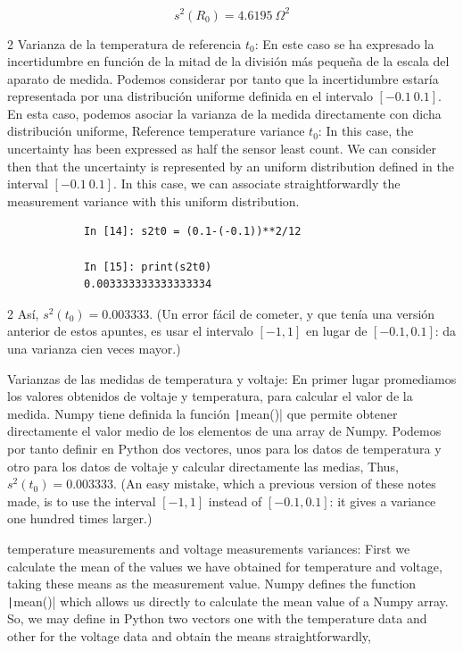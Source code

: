 \begin{equation*}
s^2(R_0)= 4.6195\ \Omega^2
\end{equation*}
\begin{paracol}{2}
\textbullet Varianza de la temperatura de referencia $t_0$: En este caso se ha expresado la incertidumbre en función de la mitad de la división más pequeña de la escala del aparato de medida. Podemos considerar por tanto que la incertidumbre estaría representada por una distribución uniforme definida en el intervalo $[-0.1\ 0.1]$. En esta caso, podemos asociar la varianza de la medida directamente con dicha distribución uniforme,
\switchcolumn
\textbullet Reference temperature variance $t_0$: In this case, the uncertainty has been expressed as half the sensor least count. We can consider then that the uncertainty is represented by an uniform distribution defined in the interval $[-0.1\ 0.1]$. In this case, we can associate straightforwardly the measurement variance with this uniform distribution.  
\end{paracol}

\begin{center}
	\begin{minipage}{\textwidth}
		\begin{verbatim}
			In [14]: s2t0 = (0.1-(-0.1))**2/12

			In [15]: print(s2t0)
			0.003333333333333334		
		\end{verbatim}
	\end{minipage}
\end{center}

\begin{paracol}{2}
Así, $s^2(t_0)=0.003333$. (Un error fácil de cometer, y que tenía una versión anterior de estos apuntes, es usar el intervalo $[-1,1]$ en lugar de $[-0.1,0.1]$: da una varianza cien veces mayor.)

\textbullet Varianzas de las medidas de temperatura y voltaje:
En primer lugar promediamos los valores  obtenidos de voltaje y temperatura, para calcular el valor de la medida. Numpy tiene definida la función \texttt|mean()| que permite obtener directamente el valor medio de los elementos de una array de Numpy. Podemos por tanto definir en Python dos vectores, unos para los datos de temperatura y otro para los datos de voltaje y calcular directamente las medias,
\switchcolumn
Thus, $s^2(t_0)=0.003333$. (An easy mistake, which a previous version of these notes made, is to use the interval $[-1,1]$ instead of $[-0.1,0.1]$: it gives a variance one hundred times larger.)

\textbullet temperature measurements and voltage measurements variances:
First we calculate the mean of the values we have obtained for temperature and voltage, taking these means as the measurement value. Numpy defines the function \texttt|mean()| which allows us directly to calculate the mean value of a Numpy array. So, we may define in Python two vectors one with the temperature data and other for the voltage data and obtain the means straightforwardly, 
\end{paracol}

